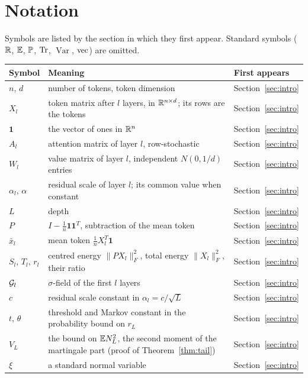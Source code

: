 \section{Notation}\label{app:notation}
Symbols are listed by the section in which they first appear. Standard symbols ($\mathbb{R}$, $\mathbb{E}$, $\mathbb{P}$, $\operatorname{Tr}$, $\operatorname{Var}$, $\operatorname{vec}$) are omitted.

{\small
\begin{center}
\begin{tabular}{@{}p{}p{}l@{}}\toprule
Symbol & Meaning & First appears \\ \midrule
$n$, $d$ & number of tokens, token dimension & Section~\ref{sec:intro} \\
$X_l$ & token matrix after $l$ layers, in $\mathbb{R}^{n\times d}$; its rows are the tokens & Section~\ref{sec:intro} \\
$\mathbf 1$ & the vector of ones in $\mathbb{R}^n$ & Section~\ref{sec:intro} \\
$A_l$ & attention matrix of layer $l$, row-stochastic & Section~\ref{sec:intro} \\
$W_l$ & value matrix of layer $l$, independent $N(0,1/d)$ entries & Section~\ref{sec:intro} \\
$\alpha_l$, $\alpha$ & residual scale of layer $l$; its common value when constant & Section~\ref{sec:intro} \\
$L$ & depth & Section~\ref{sec:intro} \\
$P$ & $I-\frac1n\mathbf 1\mathbf 1^{T}$, subtraction of the mean token & Section~\ref{sec:intro} \\
$\bar x_l$ & mean token $\frac1nX_l^{T}\mathbf 1$ & Section~\ref{sec:intro} \\
$S_l$, $T_l$, $r_l$ & centred energy $\|PX_l\|_F^2$, total energy $\|X_l\|_F^2$, their ratio & Section~\ref{sec:intro} \\
$\mathcal{G}_l$ & $\sigma$-field of the first $l$ layers & Section~\ref{sec:intro} \\
$c$ & residual scale constant in $\alpha_l=c/\sqrt L$ & Section~\ref{sec:intro} \\
$t$, $\theta$ & threshold and Markov constant in the probability bound on $r_L$ & Section~\ref{sec:intro} \\
$V_L$ & the bound on $\mathbb{E} N_L^2$, the second moment of the martingale part (proof of Theorem~\ref{thm:tail}) & Section~\ref{sec:intro} \\
$\xi$ & a standard normal variable & Section~\ref{sec:intro} \\

\end{tabular}
\end{center}}
